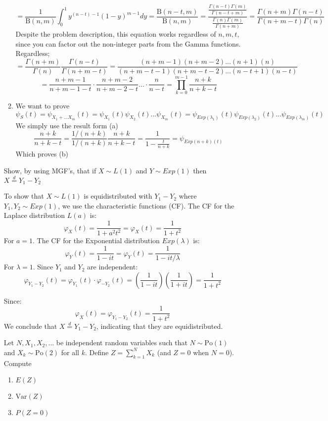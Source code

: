 \begin{enumerate}[label=(\alph*)]
\begin{enumerate}
\[
    = \frac{1}{\mathrm{B}(n,m)} \int_{0}^{1} y^{(n-t)-1} (1-y)^{m-1} dy = \frac{\mathrm{B}(n-t,m)}{\mathrm{B}(n,m)} = \frac{\frac{\Gamma(n-t)\Gamma(m)}{\Gamma(n-t+m)}}{\frac{\Gamma(n)\Gamma(m)}{\Gamma(n+m)}} =
     \frac{\Gamma(n+m)\Gamma(n-t)}{\Gamma(n+m-t)\Gamma(n)}
\]
Despite the problem description, this equation works regardless of $n,m,t$, since you can factor out the non-integer parts from the Gamma functions. Regardless; 
\[
    =\frac{\Gamma(n+m)}{\Gamma(n)} \frac{\Gamma(n-t)}{\Gamma(n+m-t)} = \frac{(n+m-1)(n+m-2)...(n+1)(n) }{(n+m-t-1)(n+m-t-2)...(n-t+1)(n-t)}
\]
\[
    = \frac{n+m-1}{n+m-1-t}\cdot\frac{n+m-2}{n+m-2-t} ...\cdot\frac{n}{n-t} = \prod_{k=0}^{m-1} \frac{n+k}{n+k-t}
\]
\item We want to prove \[
  \psi_S(t) = \psi_{X_1 + ... X_m}(t) = \psi_{X_1}(t)\psi_{X_2}(t)...\psi_{X_m}(t) = \psi_{Exp(\lambda_1)}(t)\psi_{Exp(\lambda_2)}(t)...\psi_{Exp(\lambda_m)}(t)
\]
We simply use the result form (a)
\[ 
    \frac{n+k}{n+k-t} = \frac{1/(n+k)}{1/(n+k)} \frac{n+k}{n+k-t} = \frac{1}{1-\frac{t}{n+k}} = \psi_{Exp(n+k)(t)}
\]
Which proves (b)
\end{enumerate}

\problem %
 Show, by using MGF's, that if $X \sim L(1)$ and $Y \sim Exp(1)$ then $X \overset{d}{=} Y_1 - Y_2$




To show that $X \sim L(1)$ is equidistributed with $Y_1 - Y_2$ where $Y_1, Y_2 \sim Exp(1)$, we use the characteristic functions (CF).
\solution
The CF for the Laplace distribution $L(a)$ is:
\[
\varphi_X(t) = \frac{1}{1 + a^2 t^2} = \varphi_X(t) = \frac{1}{1 + t^2}
\]
For $a=1$. The CF for the Exponential distribution $Exp(\lambda)$ is:
\[
\varphi_Y(t) = \frac{1}{1 - it} =
\varphi_Y(t) = \frac{1}{1 - it/\lambda}
\]
For $\lambda=1$. Since $Y_1$ and $Y_2$ are independent:
\[
\varphi_{Y_1 - Y_2}(t) = \varphi_{Y_1}(t) \cdot \varphi_{-Y_2}(t) = \left(\frac{1}{1 - it}\right) \left(\frac{1}{1 + it}\right) = \frac{1}{1 + t^2}
\]

Since:
\[
\varphi_X(t) = \varphi_{Y_1 - Y_2}(t) = \frac{1}{1 + t^2}
\]
We conclude that $X \overset{d}{=} Y_1 - Y_2$, indicating that they are equidistributed.


\setcounter{problem}{21}
\problem 
Let \( N, X_1, X_2, \dots \) be independent random variables such that 
\( N \sim \text{Po}(1) \) and \( X_k \sim \text{Po}(2) \) for all \( k \). 
Define \( Z = \sum_{k=1}^N X_k \) (and \( Z = 0 \) when \( N = 0 \)). Compute
\begin{enumerate}
    \item \( E(Z) \)
    \item\( \text{Var}(Z) \) 
    \item \( P(Z = 0) \)
\end{enumerate}


\end{enumerate}
